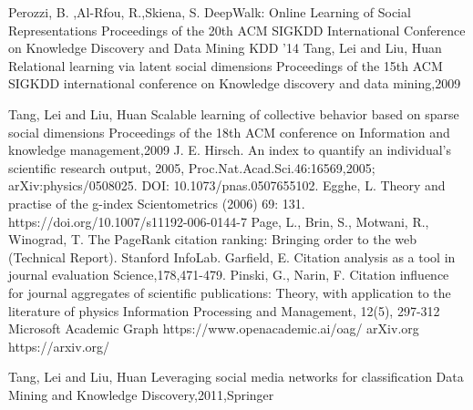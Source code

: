 \documentclass[a4paper, 11pt]{article}
\begin{document}
\begin{thebibliography}{9}
Perozzi, B. ,Al-Rfou, R.,Skiena, S.
\newblock DeepWalk: Online Learning of Social Representations
\newblock Proceedings of the 20th ACM SIGKDD International Conference on Knowledge Discovery and Data Mining
\newblock KDD '14
Tang, Lei and Liu, Huan
\newblock Relational learning via latent social dimensions
\newblock Proceedings of the 15th ACM SIGKDD international conference on Knowledge discovery and data mining,2009



Tang, Lei and Liu, Huan
 \newblock Scalable learning of collective behavior based on sparse social dimensions
  \newblock Proceedings of the 18th ACM conference on Information and knowledge management,2009
J. E. Hirsch.
\newblock An index to quantify an individual's scientific research output, 2005,
\newblock Proc.Nat.Acad.Sci.46:16569,2005;
\newblock arXiv:physics/0508025.
\newblock DOI: 10.1073/pnas.0507655102.
Egghe, L.
\newblock  Theory and practise of the g-index
\newblock Scientometrics (2006) 69: 131.
\newblock https://doi.org/10.1007/s11192-006-0144-7
Page, L., Brin, S., Motwani, R., Winograd, T. 
\newblock  The PageRank citation ranking: Bringing order to the web  
\newblock  (Technical Report). Stanford InfoLab.
Garfield, E.
\newblock  Citation analysis as a tool in journal evaluation
\newblock Science,178,471-479.
Pinski, G.,  Narin, F. 
\newblock Citation influence for journal aggregates of scientific publications: Theory, with application to the literature of physics
\newblock  Information Processing and Management, 12(5), 297-312
Microsoft Academic Graph 
\newblock https://www.openacademic.ai/oag/
arXiv.org
\newblock  https://arxiv.org/


  Tang, Lei and Liu, Huan
  \newblock Leveraging social media networks for classification
  \newblock Data Mining and Knowledge Discovery,2011,Springer
 
\end{thebibliography}

\listoffigures
\end{document}
